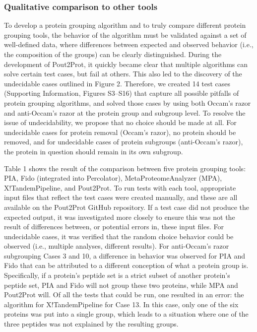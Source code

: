 \hypertarget{qualitative-comparison-to-other-tools}{%
\subsubsection{Qualitative comparison to other
tools}\label{qualitative-comparison-to-other-tools}}

To develop a protein grouping algorithm and to truly compare different
protein grouping tools, the behavior of the algorithm must be validated
against a set of well-defined data, where differences between expected
and observed behavior (i.e., the composition of the groups) can be
clearly distinguished. During the development of Pout2Prot, it quickly
became clear that multiple algorithms can solve certain test cases, but
fail at others. This also led to the discovery of the undecidable cases
outlined in Figure 2. Therefore, we created 14 test cases (Supporting
Information, Figures S3--S16) that capture all possible pitfalls of
protein grouping algorithms, and solved those cases by using both
Occam's razor and anti-Occam's razor at the protein group and subgroup
level. To resolve the issue of undecidability, we propose that no choice
should be made at all. For undecidable cases for protein removal
(Occam's razor), no protein should be removed, and for undecidable cases
of protein subgroups (anti-Occam's razor), the protein in question
should remain in its own subgroup.

Table 1 shows the result of the comparison between five protein grouping
tools: PIA, Fido (integrated into Percolator), MetaProteomeAnalyzer
(MPA), X!TandemPipeline, and Pout2Prot. To run tests with each tool,
appropriate input files that reflect the test cases were created
manually, and these are all available on the Pout2Prot GitHub
repository. If a test case did not produce the expected output, it was
investigated more closely to ensure this was not the result of
differences between, or potential errors in, these input files. For
undecidable cases, it was verified that the random choice behavior could
be observed (i.e., multiple analyses, different results). For
anti-Occam's razor subgrouping Cases 3 and 10, a difference in behavior
was observed for PIA and Fido that can be attributed to a different
conception of what a protein group is. Specifically, if a protein's
peptide set is a strict subset of another protein's peptide set, PIA and
Fido will not group these two proteins, while MPA and Pout2Prot will. Of
all the tests that could be run, one resulted in an error: the algorithm
for X!TandemPipeline for Case 13. In this case, only one of the six
proteins was put into a single group, which leads to a situation where
one of the three peptides was not explained by the resulting groups.

